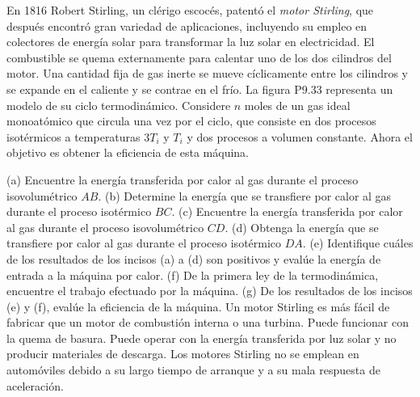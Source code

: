\item En 1816 Robert Stirling, un clérigo escocés, patentó el \textit{motor Stirling}, que después encontró gran variedad de aplicaciones, incluyendo su empleo en colectores de energía solar para transformar la luz solar en electricidad. El combustible se quema externamente para calentar uno de los dos cilindros del motor. Una cantidad fija de gas inerte se mueve cíclicamente entre los cilindros y se expande en el caliente y se contrae en el frío. La figura P9.33 representa un modelo de su ciclo termodinámico. Considere $n$ moles de un gas ideal monoatómico que circula una vez por el ciclo, que consiste en dos procesos isotérmicos a temperaturas $3T_i$ y $T_i$ y dos procesos a volumen constante. Ahora el objetivo es obtener la eficiencia de esta máquina. 

(a) Encuentre la energía transferida por calor al gas durante el proceso isovolumétrico $AB$. 
(b) Determine la energía que se transfiere por calor al gas durante el proceso isotérmico $BC$. 
(c) Encuentre la energía transferida por calor al gas durante el proceso isovolumétrico $CD$. 
(d) Obtenga la energía que se transfiere por calor al gas durante el proceso isotérmico $DA$. 
(e) Identifique cuáles de los resultados de los incisos (a) a (d) son positivos y evalúe la energía de entrada a la máquina por calor. 
(f) De la primera ley de la termodinámica, encuentre el trabajo efectuado por la máquina. 
(g) De los resultados de los incisos (e) y (f), evalúe la eficiencia de la máquina. Un motor Stirling es más fácil de fabricar que un motor de combustión interna o una turbina. Puede funcionar con la quema de basura. Puede operar con la energía transferida por luz solar y no producir materiales de descarga. Los motores Stirling no se emplean en automóviles debido a su largo tiempo de arranque y a su mala respuesta de aceleración.
